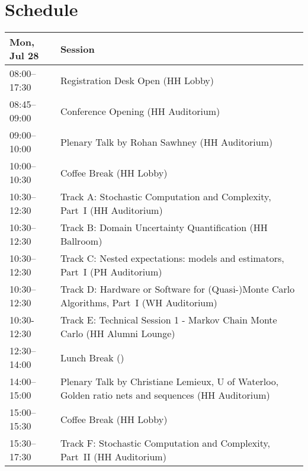 \chapter{Schedule}
\begin{table}
{\footnotesize
\begin{tabularx}{\textwidth}{>{\hsize=0.32\hsize}X|>{\hsize=1.7\hsize}X}
\hline
\textbf{Mon, Jul 28} & \textbf{Session} \\
\hline
\cellcolor{\EmptyColor}08:00–17:30 & \cellcolor{\EmptyColor}Registration Desk Open (HH Lobby) \\
\cellcolor{\PlenaryColor}08:45–09:00 & \cellcolor{\PlenaryColor}Conference Opening (HH Auditorium) \\
\cellcolor{\PlenaryColor}09:00–10:00 & \cellcolor{\PlenaryColor}Plenary Talk by Rohan Sawhney (HH Auditorium) \\
\cellcolor{\EmptyColor}10:00–10:30 & \cellcolor{\EmptyColor}Coffee Break (HH Lobby) \\
\cellcolor{\SessionTitleColor}10:30–12:30 & \cellcolor{\SessionTitleColor}Track A: Stochastic Computation and Complexity, Part~I (HH Auditorium) \\
\cellcolor{\SessionTitleColor}10:30–12:30 & \cellcolor{\SessionTitleColor}Track B: Domain Uncertainty Quantification (HH Ballroom) \\
\cellcolor{\SessionTitleColor}10:30–12:30 & \cellcolor{\SessionTitleColor}Track C: Nested expectations: models and estimators, Part~I (PH Auditorium) \\
\cellcolor{\SessionTitleColor}10:30–12:30 & \cellcolor{\SessionTitleColor}Track D: Hardware or Software for (Quasi-)Monte Carlo Algorithms, Part~I (WH Auditorium) \\
\cellcolor{\SessionLightColor}10:30-12:30 & \cellcolor{\SessionLightColor}Track E: Technical Session 1 - Markov Chain Monte Carlo (HH Alumni Lounge) \\
\cellcolor{\EmptyColor}12:30–14:00 & \cellcolor{\EmptyColor}Lunch Break () \\
\cellcolor{\PlenaryColor}14:00–15:00 & \cellcolor{\PlenaryColor}Plenary Talk by Christiane Lemieux, U of Waterloo, Golden ratio nets and sequences (HH Auditorium) \\
\cellcolor{\EmptyColor}15:00–15:30 & \cellcolor{\EmptyColor}Coffee Break (HH Lobby) \\
\cellcolor{\SessionTitleColor}15:30–17:30 & \cellcolor{\SessionTitleColor}Track F: Stochastic Computation and Complexity, Part~II (HH Auditorium) \\

\end{tabularx}}
\end{table}
